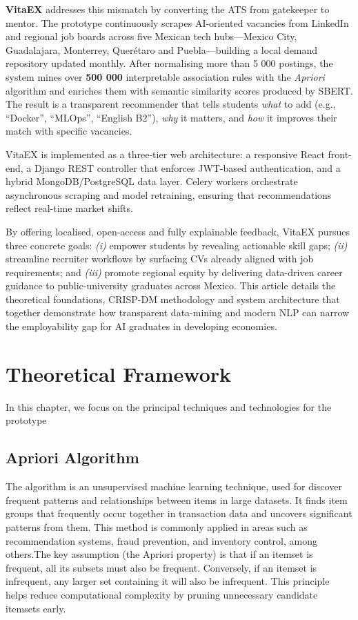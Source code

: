 \documentclass[runningheads]{llncs}
\begin{document}
\textbf{VitaEX} addresses this mismatch by converting the ATS from gatekeeper to mentor.  
The prototype continuously scrapes AI-oriented vacancies from LinkedIn and regional job boards across five Mexican tech hubs—Mexico City, Guadalajara, Monterrey, Querétaro and Puebla—building a local demand repository updated monthly.  
After normalising more than 5 000 postings, the system mines over \textbf{500 000} interpretable association rules with the \emph{Apriori} algorithm and enriches them with semantic similarity scores produced by SBERT.  
The result is a transparent recommender that tells students \emph{what} to add (e.g., “Docker”, “MLOps”, “English B2”), \emph{why} it matters, and \emph{how} it improves their match with specific vacancies.

VitaEX is implemented as a three-tier web architecture: a responsive React front-end, a Django REST controller that enforces JWT-based authentication, and a hybrid MongoDB/PostgreSQL data layer.  
Celery workers orchestrate asynchronous scraping and model retraining, ensuring that recommendations reflect real-time market shifts.

By offering localised, open-access and fully explainable feedback, VitaEX pursues three concrete goals:  
\emph{(i)} empower students by revealing actionable skill gaps;  
\emph{(ii)} streamline recruiter workflows by surfacing CVs already aligned with job requirements; and  
\emph{(iii)} promote regional equity by delivering data-driven career guidance to public-university graduates across Mexico.  
This article details the theoretical foundations, CRISP-DM methodology and system architecture that together demonstrate how transparent data-mining and modern NLP can narrow the employability gap for AI graduates in developing economies.

	
	
	\section{Theoretical Framework}
	In this chapter, we focus on the principal techniques and technologies for the prototype
	\subsection{Apriori Algorithm}
	
	The algorithm is an unsupervised machine learning technique, used for discover frequent patterns and relationships between items in large datasets. It finds item groups that frequently occur together in transaction data and uncovers significant patterns from them. This method is commonly applied in areas such as recommendation systems, fraud prevention, and inventory control, among others.The key assumption (the Apriori property) is that if an itemset is frequent, all its subsets must also be frequent. Conversely, if an itemset is infrequent, any larger set containing it will also be infrequent. This principle helps reduce computational complexity by pruning unnecessary candidate itemsets early. \cite{ibm_apriori}
\end{document}
